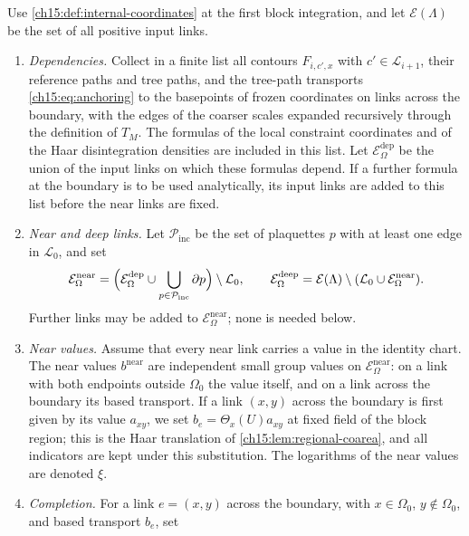 \begin{definition}\label{ch15:def:bare-completion}
Use \cref{ch15:def:internal-coordinates} at the first block integration, and let $\mathcal E(\Lambda)$ be the set of all positive input links.
\begin{enumerate}
\item \emph{Dependencies.} Collect in a finite list all contours $F_{i,c',x}$ with $c'\in\mathcal L_{i+1}$, their reference paths and tree paths, and the tree-path transports \eqref{ch15:eq:anchoring} to the basepoints of frozen coordinates on links across the boundary, with the edges of the coarser scales expanded recursively through the definition of $T_M$. The formulas of the local constraint coordinates and of the Haar disintegration densities are included in this list. Let $\mathcal E^{\mathrm{dep}}_\Omega$ be the union of the input links on which these formulas depend. If a further formula at the boundary is to be used analytically, its input links are added to this list before the near links are fixed.
\item \emph{Near and deep links.} Let $\mathcal P_{\mathrm{inc}}$ be the set of plaquettes $p$ with at least one edge in $\mathcal L_0$, and set
\begin{equation}\label{ch15:eq:near-deep}
 \mathcal E^{\mathrm{near}}_\Omega=
 \Bigl(\mathcal E^{\mathrm{dep}}_\Omega\cup\bigcup_{p\in\mathcal P_{\mathrm{inc}}}\partial p\Bigr)
                      \setminus\mathcal L_0,
 \qquad
 \mathcal E^{\mathrm{deep}}_\Omega=\mathcal E(\Lambda)\setminus(\mathcal L_0\cup\mathcal E^{\mathrm{near}}_\Omega).
\end{equation}
Further links may be added to $\mathcal E^{\mathrm{near}}_\Omega$; none is needed below.
\item \emph{Near values.} Assume that every near link carries a value in the identity chart. The near values $b^{\mathrm{near}}$ are independent small group values on $\mathcal E^{\mathrm{near}}_\Omega$: on a link with both endpoints outside $\Omega_0$ the value itself, and on a link across the boundary its based transport. If a link $(x,y)$ across the boundary is first given by its value $a_{xy}$, we set $b_e=\Theta_x(U)a_{xy}$ at fixed field of the block region; this is the Haar translation of \cref{ch15:lem:regional-coarea}, and all indicators are kept under this substitution. The logarithms of the near values are denoted $\xi$.
\item \emph{Completion.} For a link $e=(x,y)$ across the boundary, with $x\in\Omega_0$, $y\notin\Omega_0$, and based transport $b_e$, set

\end{enumerate}
\end{definition}
